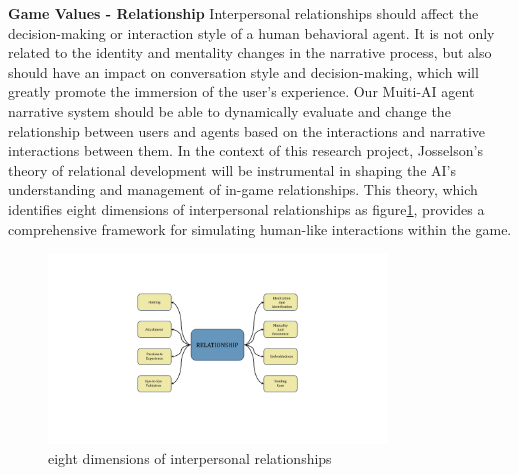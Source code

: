 \textbf{Game Values - Relationship}\quad
Interpersonal relationships should affect the decision-making or interaction style of a human behavioral agent. It is not only related to the identity and mentality changes in the narrative process, 
but also should have an impact on conversation style and decision-making, which will greatly promote the immersion of the user's experience.
Our Muiti-AI agent narrative system should be able to dynamically evaluate and change the relationship between users and agents based on the interactions and narrative interactions between them. 
In the context of this research project, Josselson's theory of relational development will be instrumental in shaping the AI's understanding and management of in-game relationships\cite{josselson1996space}. 
This theory, which identifies eight dimensions of interpersonal relationships as figure\ref{fig:relationship}, provides a comprehensive framework for simulating human-like interactions within the game.
\begin{figure}
    \centering
    \includegraphics[width=0.8\textwidth]{image/relationship.pdf}
    \caption{eight dimensions of interpersonal relationships}
  \label{fig:relationship}
\end{figure}

